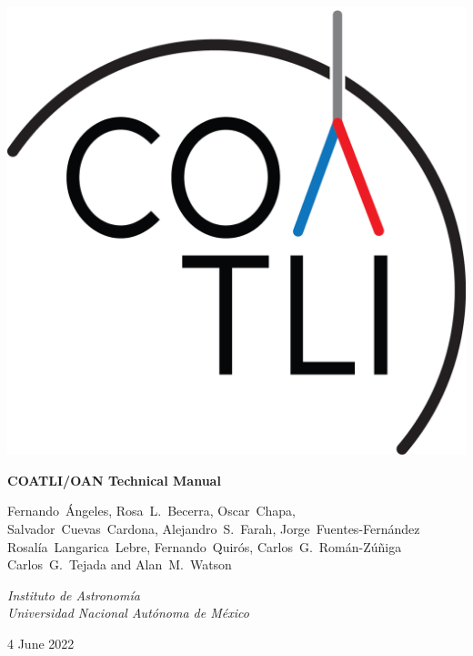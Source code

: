 
\pagestyle{empty}

\begin{centering}

\ifcoatlioan
\bigskip
\bigskip
\includegraphics[width=\linewidth]{figures/logo-gn.png}
\bigskip
\bigskip
{
 \Large
 \bfseries 
 COATLI/OAN Technical Manual
 \par
}
\bigskip
{
\baselineskip=10pt
 \large
 Fernando~Ángeles,
 Rosa~L.~Becerra,
 Oscar~Chapa,\\
 Salvador~Cuevas~Cardona,
 Alejandro~S.~Farah,
 Jorge~Fuentes-Fernández\\
 Rosalía~Langarica~Lebre,
 Fernando~Quirós,
 Carlos~G.~Román-Zúñiga\\
 Carlos~G.~Tejada
 and
 Alan~M.~Watson
 \par
}
\bigskip
{
 \large
 \itshape 
 Instituto de Astronomía\\
 Universidad Nacional Autónoma de México
 \par
}
\bigskip
{
 \large
 4 June 2022
}
\fi

\ifddotioan
\bigskip
\bigskip


\end{centering}
